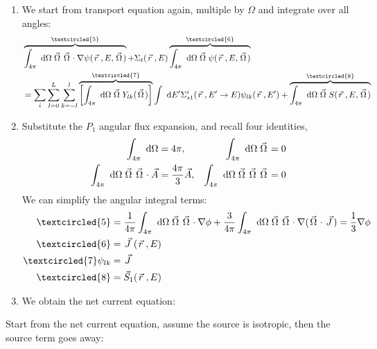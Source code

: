 \documentclass{school-22.211-notes}
\begin{document}
\clearpage
{}
\begin{enumerate}
\item We start from transport equation again, multiple by $\Omega$ and integrate over all angles: 
\begin{align}
& \overbrace{\int_{4\pi} \dOmega \vecOmega \vecOmega \cdot \gradient \psi(\vecr, E, \vecOmega)}^{\textcircled{5}} 
+ \Sigma_t (\vecr, E) \overbrace{\int_{4\pi} \dOmega \vecOmega \psi(\vecr, E, \vecOmega)}^{\textcircled{6}} \\
&= \Sum_i \Sum_{l=0}^L \Sum_{k=-l}^l \overbrace{\left[\int_{4\pi} \dOmega \vecOmega Y_{lk} (\vecOmega) \right]}^{\textcircled{7}} \int \dE' \Sigma_{s1}^i (\vecr, E'\to E) \psi_{lk}(\vecr, E') 
+ \overbrace{\int_{4\pi} \dOmega \vecOmega S(\vecr, E, \vecOmega)}^{\textcircled{8}} 
\end{align}

\item Substitute the $P_1$ angular flux expansion, 
and recall four identities,
\begin{align}
\int_{4\pi} \mbox{ }\mathrm{d} \Omega &= 4 \pi, & \int_{4\pi} \mbox{ }\mathrm{d} \Omega \left.\vec{\Omega}\right. &= 0 \\
\int_{4\pi} \mbox{ }\mathrm{d} \Omega \left.\vec{\Omega}\right. \left.\vec{\Omega}\right. \cdot \vec{A} &= \frac{4\pi}{3} \vec{A}, & \int_{4\pi} \mbox{ }\mathrm{d} \Omega \left.\vec{\Omega}\right. \left.\vec{\Omega}\right. \left.\vec{\Omega}\right. &= 0 
\end{align}
We can simplify the angular integral terms:
\begin{align}
\textcircled{5} &= \frac{1}{4\pi} \int_{4\pi} \dOmega \vecOmega \vecOmega \cdot \gradient \phi + \frac{3}{4\pi} \int_{4\pi} \dOmega \vecOmega \vecOmega \cdot \gradient (\vecOmega \cdot \vecJ) = \frac{1}{3} \gradient \phi \\
\textcircled{6} &= \vecJ (\vecr, E) \\
\textcircled{7} \psi_{lk} &= \vecJ \\
\textcircled{8} &= \vec{S}_1 (\vecr, E) 
\end{align}

\item We obtain the net current equation:
\end{enumerate}


\clearpage
{}
Start from the net current equation, assume the source is isotropic, then the source term goes away:
\end{document}
